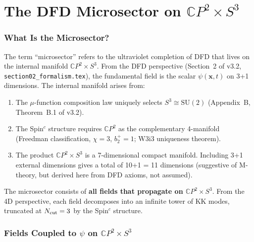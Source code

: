 \documentclass[11pt,a4paper]{article}
\newcommand{\CP}{\mathbb{C}P}
\newcommand{\mufd}{\mu}
\newcommand{\Ncut}{N_{\rm cut}}
\begin{document}
\part{The DFD Microsector on $\CP^2 \times S^3$}
\label{part:microsector}

\section{What Is the Microsector?}
\label{sec:microsector-def}

The term ``microsector'' refers to the ultraviolet completion of DFD
that lives on the internal manifold $\CP^2 \times S^3$. From the DFD
perspective (Section~2 of v3.2, \texttt{section02\_formalism.tex}), the
fundamental field is the scalar $\psi(\mathbf{x}, t)$ on 3+1
dimensions. The internal manifold arises from:

\begin{enumerate}[label=(\roman*)]
\item The $\mufd$-function composition law uniquely selects $S^3 \cong
  \mathrm{SU}(2)$ (Appendix~B, Theorem~B.1 of v3.2).
\item The Spin$^c$ structure requires $\CP^2$ as the complementary
  4-manifold (Freedman classification, $\chi = 3$, $b_2^+ = 1$;
  W3i3 uniqueness theorem).
\item The product $\CP^2 \times S^3$ is a 7-dimensional compact
  manifold. Including 3+1 external dimensions gives a total of
  10+1 = 11 dimensions (suggestive of M-theory, but derived here
  from DFD axioms, not assumed).
\end{enumerate}

The microsector consists of \textbf{all fields that propagate on
$\CP^2 \times S^3$}. From the 4D perspective, each field decomposes
into an infinite tower of KK modes, truncated at $\Ncut = 3$ by the
Spin$^c$ structure.


\section{Fields Coupled to $\psi$ on $\CP^2 \times S^3$}
\label{sec:fields}
\end{document}
